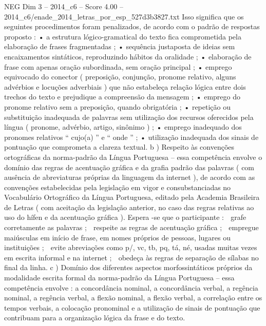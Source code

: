 \begin{textsample}{NEG Dim 3 – 2014\_c6 – Score 4.00 – 2014\_c6/enade\_2014\_letras\_por\_esp\_527d3b3827.txt}
Isso significa que os seguintes procedimentos foram penalizados, de acordo com o padrão de respostas proposto : • a estrutura lógico-gramatical do texto fica comprometida pela elaboração de frases fragmentadas ; • sequência justaposta de ideias sem encaixamentos sintáticos, reproduzindo hábitos da oralidade ; • elaboração de frase com apenas oração subordinada, sem oração principal ; • emprego equivocado do conector ( preposição, conjunção, pronome relativo, alguns advérbios e locuções adverbiais ) que não estabeleça relação lógica entre dois trechos do texto e prejudique a compreensão da mensagem ; • emprego do pronome relativo sem a preposição, quando obrigatória ; • repetição ou substituição inadequada de palavras sem utilização dos recursos oferecidos pela língua ( pronome, advérbio, artigo, sinônimo ) ; • emprego inadequado dos pronomes relativos “ cujo(a) ” e “ onde ” ; • utilização inadequada dos sinais de pontuação que comprometa a clareza textual. b ) Respeito às convenções ortográficas da norma-padrão da Língua Portuguesa – essa competência envolve o domínio das regras de acentuação gráfica e da grafia padrão das palavras ( com ausência de abreviaturas próprias da linguagem da internet ), de acordo com as convenções estabelecidas pela legislação em vigor e consubstanciadas no Vocabulário Ortográfico da Língua Portuguesa, editado pela Academia Brasileira de Letras ( com aceitação da legislação anterior, no caso das regras relativas ao uso do hífen e da acentuação gráfica ).
Espera -se que o participante :  grafe corretamente as palavras ;  respeite as regras de acentuação gráfica ;  empregue maiúsculas em início de frase, em nomes próprios de pessoas, lugares ou instituições ;  evite abreviações como p/, vc, tb, pq, tá, né, usadas muitas vezes em escrita informal e na internet ;  obedeça às regras de separação de sílabas no final da linha. c ) Domínio dos diferentes aspectos morfossintáticos próprios da modalidade escrita formal da norma-padrão da Língua Portuguesa – essa competência envolve : a concordância nominal, a concordância verbal, a regência nominal, a regência verbal, a flexão nominal, a flexão verbal, a correlação entre os tempos verbais, a colocação pronominal e a utilização de sinais de pontuação que contribuam para a organização lógica da frase e do texto.

\end{textsample}
